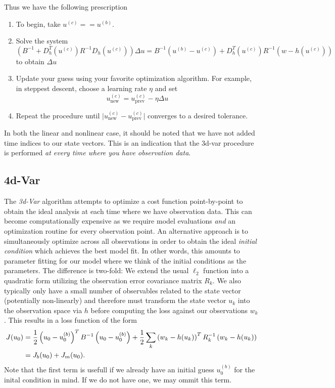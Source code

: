 Thus we have the following prescription
\begin{enumerate}
\item To begin, take $u^{(c)} == u^{(b)}$.
\item Solve the system
  \begin{equation}
    \left(B^{-1} + D_h^T(u^{(c)})R^{-1}D_h(u^{(c)}) \right)\Delta u = B^{-1}(u^{(b)}-u^{(c)}) + D_h^T(u^{(c)})R^{-1}(w-h(u^{(c)}))
  \end{equation}
to obtain $\Delta u$
\item Update your guess using your favorite optimization algorithm. For example, in steppest descent, choose a learning rate $\eta$ and set
  \begin{equation}
    u_{\text{new}}^{(c)}  = u_{\text{prev}}^{(c)} - \eta\Delta u
  \end{equation}
\item Repeat the procedure until $\lvert u_{\text{new}}^{(c)} - u_{\text{prev}}^{(c)} \rvert$ converges to a desired tolerance.
\end{enumerate}


In both the linear and nonlinear case, it should be noted that we have not added time indices to our state vectors. This is an indication that the 3d-var procedure is performed \textit{at every time where you have observation data}.


\subsection{4d-Var}

The \textit{3d-Var} algorithm attempts to optimize a cost function point-by-point to obtain the ideal analysis at each time where we have observation data. This can become computationally expensive as we require model evaluations \textit{and} an optimization routine for every observation point. An alternative approach is to simultaneously optimize across all observations in order to obtain the ideal \textit{initial condition} which achieves the best model fit. In other words, this amounts to parameter fitting for our model where we think of the initial conditions as the parameters. The difference is two-fold: We extend the usual $\ell_2$ function into a quadratic form utilizing the observation error covariance matrix $R_k$. We also typically only have a small number of observables related to the state vector (potentially non-linearly) and therefore must transform the state vector $u_k$ into the observation space via $h$ before computing the loss against our observations $w_k$. This results in a loss function of the form
\begin{align}
    J(u_0) &= \frac{1}{2}\left( u_0 - u_0^{(b)} \right)^TB^{-1}\left( u_0 - u_0^{(b)} \right) + \frac{1}{2}\sum_k\left(w_k - h(u_k) \right)^TR_k^{-1}\left(w_k - h(u_k) \right) \\
           &= J_b(u_0) + J_m(u_0) \notag.
\end{align}
Note that the first term is usefull if we already have an initial guess $u_0^{(b)}$ for the inital condition in mind. If we do not have one, we may ommit this term.


